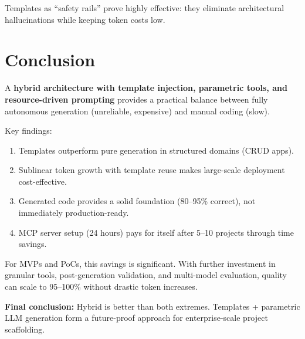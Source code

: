 Templates as ``safety rails'' prove highly effective: they eliminate architectural hallucinations while keeping token costs low.

\section*{Conclusion}

A \textbf{hybrid architecture with template injection, parametric tools, and resource-driven prompting} provides a practical balance between fully autonomous generation (unreliable, expensive) and manual coding (slow).

Key findings:
\begin{enumerate}
  \item Templates outperform pure generation in structured domains (CRUD apps).
  
  \item Sublinear token growth with template reuse makes large-scale deployment cost-effective.
  
  \item Generated code provides a solid foundation (80--95\% correct), not immediately production-ready.
  
  \item MCP server setup (24 hours) pays for itself after 5--10 projects through time savings.
\end{enumerate}

For MVPs and PoCs, this savings is significant. With further investment in granular tools, post-generation validation, and multi-model evaluation, quality can scale to 95--100\% without drastic token increases.

\textbf{Final conclusion:} Hybrid is better than both extremes. Templates + parametric LLM generation form a future-proof approach for enterprise-scale project scaffolding.